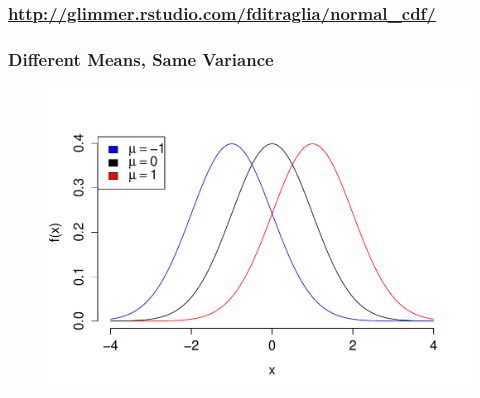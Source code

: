 \documentclass[handout]{beamer}
\begin{document}
\begin{frame}
	\frametitle{\href{http://glimmer.rstudio.com/fditraglia/normal_cdf/}{http://glimmer.rstudio.com/fditraglia/normal\_cdf/}}

\begin{figure}
\end{figure}

\end{frame}





\begin{frame}
\frametitle{Different Means, Same Variance}

\begin{figure}
\includegraphics[scale = 0.65]{./images/normal_means}
\end{figure}
\end{frame}
\end{document}
